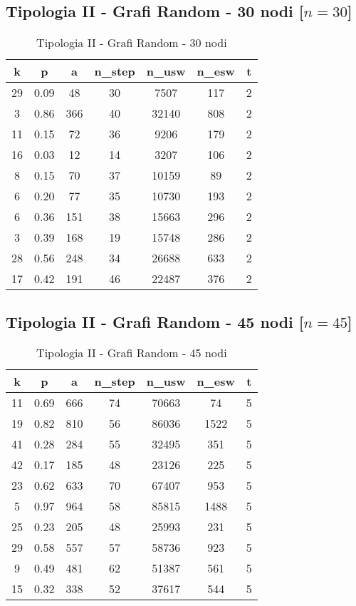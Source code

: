 \subsection{Tipologia II - Grafi Random - 30 nodi [$n=30$]}

\begin{table}[H]
\centering
\begin{tabular}{|c|c|c|c|c|c|c|}
\hline
\textbf{k} & \textbf{p} & \textbf{a} & \textbf{n\_step} & \textbf{n\_usw} & \textbf{n\_esw} & \textbf{t} \\ \hline
29 & 0.09 & 48 & 30 & 7507 & 117 & 2 \\ \hline
3 & 0.86 & 366 & 40 & 32140 & 808 & 2 \\ \hline
11 & 0.15 & 72 & 36 & 9206 & 179 & 2 \\ \hline
16 & 0.03 & 12 & 14 & 3207 & 106 & 2 \\ \hline
8 & 0.15 & 70 & 37 & 10159 & 89 & 2 \\ \hline
6 & 0.20 & 77 & 35 & 10730 & 193 & 2 \\ \hline
6 & 0.36 & 151 & 38 & 15663 & 296 & 2 \\ \hline
3 & 0.39 & 168 & 19 & 15748 & 286 & 2 \\ \hline
28 & 0.56 & 248 & 34 & 26688 & 633 & 2 \\ \hline
17 & 0.42 & 191 & 46 & 22487 & 376 & 2 \\ \hline
\end{tabular}
\caption{Tipologia II - Grafi Random - 30 nodi}
\label{tab:sperimentazione-tipo1-30nodi}
\end{table}

\subsection{Tipologia II - Grafi Random - 45 nodi [$n=45$]}

\begin{table}[H]
\centering
\begin{tabular}{|c|c|c|c|c|c|c|}
\hline
\textbf{k} & \textbf{p} & \textbf{a} & \textbf{n\_step} & \textbf{n\_usw} & \textbf{n\_esw} & \textbf{t} \\ \hline
11 & 0.69 & 666 & 74 & 70663 & 74 & 5 \\ \hline
19 & 0.82 & 810 & 56 & 86036 & 1522 & 5 \\ \hline
41 & 0.28 & 284 & 55 & 32495 & 351 & 5 \\ \hline
42 & 0.17 & 185 & 48 & 23126 & 225 & 5 \\ \hline
23 & 0.62 & 633 & 70 & 67407 & 953 & 5 \\ \hline
5 & 0.97 & 964 & 58 & 85815 & 1488 & 5 \\ \hline
25 & 0.23 & 205 & 48 & 25993 & 231 & 5 \\ \hline
29 & 0.58 & 557 & 57 & 58736 & 923 & 5 \\ \hline
9 & 0.49 & 481 & 62 & 51387 & 561 & 5 \\ \hline
15 & 0.32 & 338 & 52 & 37617 & 544 & 5 \\ \hline
\end{tabular}
\caption{Tipologia II - Grafi Random - 45 nodi}
\label{tab:sperimentazione-tipo1-45nodi}
\end{table}

